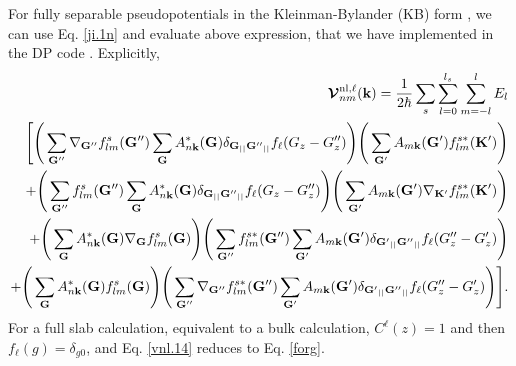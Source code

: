 \documentclass[letterpaper,aps]{revtex4}
\begin{document}
For fully  separable pseudopotentials in the Kleinman-Bylander (KB) form
\cite{mottaCMS10,kleinmanPRL82,adolphPRB96}, we can use Eq. \eqref{ji.1n} and
evaluate above expression, that we have implemented in the DP code
\cite{olevanoDP}. Explicitly,
\begin{eqnarray}\label{vnl.14}
\boldsymbol{\mathcal{V}}^{\mathrm{nl},\ell}_{nm}(\mathbf{k})=\frac{1}{2 \hbar}
\sum_s\sum_{l=0}^{l_s}\sum_{m=-l}^{l}E_l \nonumber\\
\Bigg[ \Bigg(\sum_{{\bfG''}}
\nabla_{{\bfG''}}f_{lm}^s({\bfG''})
\sum_{\bfG}A^*_{n{\mathbf{k}}}(\bfG)\delta_{\bfG_{||}{\bfG''}_{||}}
f_\ell(G_z-G''_z) \Bigg)  
\Bigg( \sum_{{\bfG'}}A_{m{\mathbf{k}}}({\bfG'})f_{lm}^{s*}({\mathbf{K}'}) \Bigg) \nonumber\\
%
+ \Bigg(\sum_{{\bfG''}}
f_{lm}^s({\bfG''})\sum_{\bfG}A^*_{n{\mathbf{k}}}(\bfG)\delta_{\bfG_{||}{\bfG''}_{||}}
f_\ell(G_z-G''_z) \Bigg)  
\Bigg( \sum_{{\bfG'}}A_{m{\mathbf{k}}}({\bfG'})\nabla_{{\mathbf{K}'}}f_{lm}^{s*}({\mathbf{K}'}) \Bigg)  \nonumber\\
+
\Bigg(\sum_{\bfG}A^*_{n{\mathbf{k}}}(\bfG)\nabla_{\bfG}f_{lm}^s(\bfG)\Bigg)\Bigg(
\sum_{{\bfG''}}
f_{lm}^{s*}({\bfG''})\sum_{{\bfG'}}A_{m{\mathbf{k}}}({\bfG'})\delta_{{\bfG'}_{||}{\bfG''}_{||}}
f_\ell(G''_z-G'_z) \Bigg) \nonumber\\ 
+
\Bigg(\sum_{\bfG}A^*_{n{\mathbf{k}}}(\bfG)f_{lm}^s(\bfG)
\Bigg) \Bigg(
\sum_{{\bfG''}}\nabla_{{\bfG''}}f_{lm}^{s*}({\bfG''})
\sum_{{\bfG'}}A_{m{\mathbf{k}}}({\bfG'})\delta_{{\bfG'}_{||}{\bfG''}_{||}}
f_\ell(G''_z-G'_z) \Bigg) \Bigg].\nonumber\\ 
\end{eqnarray} 
For a full slab calculation, equivalent to a bulk calculation,
$C^\ell(z)=1$ and then 
$f_\ell(g) =\delta_{g0}$, and Eq. \eqref{vnl.14}
reduces to 
Eq. \eqref{forg}. 



\end{document}

